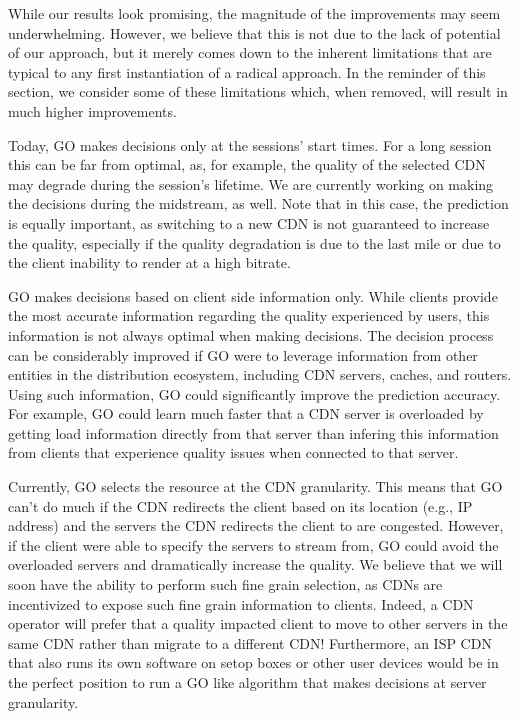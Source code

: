 
While our results look promising, the magnitude of the improvements
may seem underwhelming. However, we believe that this is not due to
the lack of potential of our approach, but it merely comes down to the
inherent limitations that are typical to any first instantiation of a
radical approach. In the reminder of this section, we consider some of
these limitations which, when removed, will result in much higher
improvements.

 Today, GO makes decisions only at
the sessions' start times. For a long session this can be far from
optimal, as, for example, the quality of the selected CDN may degrade
during the session's lifetime. We are currently working on making the
decisions during the midstream, as well. Note that in this case, the
prediction is equally important, as switching to a new CDN is not
guaranteed to increase the quality, especially if the quality
degradation is due to the last mile or due to the client inability to
render at a high bitrate.

 GO makes
decisions based on client side information only. While clients provide
the most accurate information regarding the quality experienced by
users, this information is not always optimal when making
decisions. The decision process can be considerably improved if GO
were to leverage information from other entities in the distribution
ecosystem, including CDN servers, caches, and routers. Using such
information, GO could significantly improve the prediction
accuracy. For example, GO could learn much faster that a CDN server is
overloaded by getting load information directly from that server than
infering this information from clients that experience quality issues
when connected to that server.

 Currently, GO selects the resource
 at the CDN granularity. This means that GO can't do much if the CDN
 redirects the client based on its location (e.g., IP address) and the
 servers the CDN redirects the client to are congested. However, if
 the client were able to specify the servers to stream from, GO could
 avoid the overloaded servers and dramatically increase the
 quality. We believe that we will soon have the ability to perform
 such fine grain selection, as CDNs are incentivized to expose such
 fine grain information to clients. Indeed, a CDN operator will prefer
 that a quality impacted client to move to other servers in the same
 CDN rather than migrate to a different CDN! Furthermore, an ISP CDN
 that also runs its own software on setop boxes or other user devices
 would be in the perfect position to run a GO like algorithm that
 makes decisions at server granularity.

